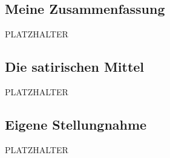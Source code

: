 \documentclass[12pt,a4paper]{scrartcl}
\begin{document}
\subsection{Meine Zusammenfassung} 
PLATZHALTER

\subsection{Die satirischen Mittel}
PLATZHALTER


\subsection{Eigene Stellungnahme} 
PLATZHALTER


\end{document}
